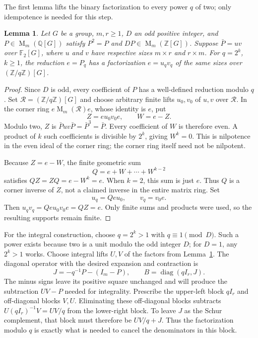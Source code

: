\documentclass[11pt]{article}
\newtheorem{lemma}[theorem]{Lemma}
\theoremstyle{remark}
\numberwithin{equation}{section}
\newcommand{\F}{\mathbb F}
\newcommand{\Z}{\mathbb Z}
\newcommand{\Q}{\mathbb Q}
\newcommand{\Mat}{\operatorname{M}}
\newcommand{\diag}{\operatorname{diag}}
\begin{document}
The first lemma lifts the binary factorization to every
power $q$ of two; only idempotence is needed for this step.

\begin{lemma}\label{lem:lift}
Let $G$ be a group, $m,r\ge1$, $D$ an odd positive integer, and
$P\in\Mat_m(\Q[G])$ satisfy $P^2=P$ and
$DP\in\Mat_m(\Z[G])$. Suppose $\bar P=uv$ over $\F_2[G]$, where $u$ and $v$
have respective sizes $m\times r$ and $r\times m$. For $q=2^k$,
$k\ge1$, the reduction $e=P_q$ has a factorization
$e=u_qv_q$ of the same sizes over $(\Z/q\Z)[G]$.
\end{lemma}

\begin{proof}
Since $D$ is odd, every coefficient of $P$ has a well-defined
reduction modulo $q$. Set $\mathcal R=(\Z/q\Z)[G]$ and choose
arbitrary finite lifts $u_0,v_0$ of $u,v$ over $\mathcal R$.
In the corner ring $e\Mat_m(\mathcal R)e$, whose identity is $e$,
put
\[
 Z=eu_0v_0e,\qquad W=e-Z.
\]
Modulo two, $Z$ is $\bar Puv\bar P=\bar P^3=\bar P$.
Every coefficient of $W$ is therefore even. A product of $k$
such coefficients is divisible by $2^k$, giving $W^k=0$.
This is nilpotence in the even ideal of the corner ring; the
corner ring itself need not be nilpotent.

Because $Z=e-W$, the finite geometric sum
\[
 Q=e+W+\cdots+W^{k-2}
\]
satisfies $QZ=ZQ=e-W^k=e$. When $k=2$, this sum is just $e$.
Thus $Q$ is a corner inverse of $Z$, not a claimed inverse in
the entire matrix ring. Set
\[
 u_q=Qeu_0,\qquad v_q=v_0e.
\]
Then $u_qv_q=Qeu_0v_0e=QZ=e$. Only finite sums and products
were used, so the resulting supports remain finite.
\end{proof}

For the integral construction, choose $q=2^k>1$ with
$q\equiv1\pmod D$. Such a power exists because two is a unit
modulo the odd integer $D$; for $D=1$, any $2^k>1$ works.
Choose integral lifts $U,V$ of the factors from Lemma~\ref{lem:lift}.
The diagonal operator with the desired expansion and contraction is
\[
 J=-q^{-1}P-(I_m-P),\qquad B=\diag(qI_r,J).
\]
The minus signs leave its positive square unchanged and will produce
the subtraction $UV-P$ needed for integrality. Prescribe the
upper-left block $qI_r$ and off-diagonal blocks $V,U$. Eliminating
these off-diagonal blocks subtracts $U(qI_r)^{-1}V=UV/q$ from the
lower-right block. To leave $J$ as the Schur complement, that block
must therefore be $UV/q+J$. Thus the factorization modulo $q$ is exactly what is
needed to cancel the denominators in this block.
\end{document}
